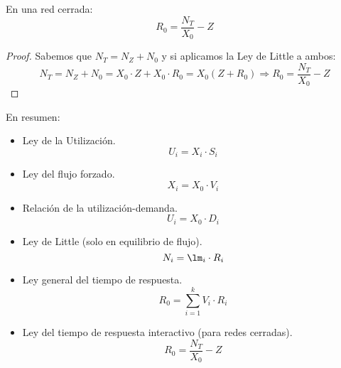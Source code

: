 \begin{prop}
    En una red cerrada:
    \begin{equation*}
        R_0 = \dfrac{N_T}{X_0} - Z
    \end{equation*}
    \begin{proof}
        Sabemos que $N_T = N_Z + N_0$ y si aplicamos la Ley de Little a ambos:
        \begin{equation*}
            N_T = N_Z + N_0 = X_0 \cdot Z + X_0\cdot R_0 = X_0(Z+R_0) \Longrightarrow R_0 = \dfrac{N_T}{X_0}-Z
        \end{equation*}
    \end{proof}
\end{prop}
En resumen:
\begin{itemize}
    \item Ley de la Utilización.
        \begin{equation*}
            U_i = X_i \cdot S_i
        \end{equation*}
    \item Ley del flujo forzado.
        \begin{equation*}
            X_i = X_0\cdot V_i
        \end{equation*}
    \item Relación de la utilización-demanda.
        \begin{equation*}
            U_i = X_0\cdot D_i
        \end{equation*}
    \item Ley de Little (solo en equilibrio de flujo).
        \begin{equation*}
            N_i = \lm_i \cdot R_i
        \end{equation*}
    \item Ley general del tiempo de respuesta.
        \begin{equation*}
            R_0 = \sum_{i=1}^{k} V_i\cdot R_i
        \end{equation*}
    \item Ley del tiempo de respuesta interactivo (para redes cerradas).
        \begin{equation*}
            R_0 = \dfrac{N_T}{X_0}-Z
        \end{equation*}
\end{itemize}

